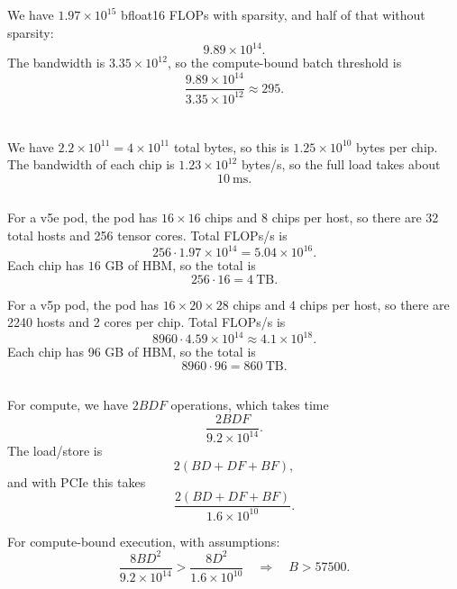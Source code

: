 \documentclass[11pt]{article}
\newcommand{\B}{B}
\newcommand{\D}{D}
\newcommand{\F}{F}
\newcommand{\ms}{\mathrm{ms}}
\newcommand{\exercisebreak}{\Needspace{8\baselineskip}}
\begin{document}
\exercisebreak
\subsection{}
We have $1.97\times 10^{15}$ bfloat16 FLOPs with sparsity, and half of that without sparsity:
\[
  9.89\times 10^{14}.
\]
The bandwidth is $3.35\times 10^{12}$, so the compute-bound batch threshold is
\[
  \frac{9.89\times 10^{14}}{3.35\times 10^{12}}
  \approx 295.
\]

\section{}

\exercisebreak
\subsection{}
We have $2.2\times 10^{11}=4\times 10^{11}$ total bytes, so this is $1.25\times 10^{10}$ bytes per chip. The bandwidth of each chip is $1.23\times 10^{12}$ bytes/s, so the full load takes about
\[
  10\ \ms.
\]

\exercisebreak
\subsection{}
For a v5e pod, the pod has $16\times 16$ chips and 8 chips per host, so there are 32 total hosts and 256 tensor cores. Total FLOPs/s is
\[
  256\cdot 1.97\times 10^{14}=5.04\times 10^{16}.
\]
Each chip has $16$ GB of HBM, so the total is
\[
  256\cdot 16 = 4\ \mathrm{TB}.
\]

For a v5p pod, the pod has $16\times 20\times 28$ chips and 4 chips per host, so there are 2240 hosts and 2 cores per chip. Total FLOPs/s is
\[
  8960\cdot 4.59\times 10^{14}\approx 4.1\times 10^{18}.
\]
Each chip has 96 GB of HBM, so the total is
\[
  8960\cdot 96 = 860\ \mathrm{TB}.
\]

\exercisebreak
\subsection{}
For compute, we have $2\B\D\F$ operations, which takes time
\[
  \frac{2\B\D\F}{9.2\times 10^{14}}.
\]
The load/store is
\[
  2(\B\D+\D\F+\B\F),
\]
and with PCIe this takes
\[
  \frac{2(\B\D+\D\F+\B\F)}{1.6\times 10^{10}}.
\]

For compute-bound execution, with assumptions:
\[
  \frac{8\B\D^2}{9.2\times 10^{14}}
  >
  \frac{8\D^2}{1.6\times 10^{10}}
  \quad\Longrightarrow\quad
  \B > 57500.
\]
\end{document}
